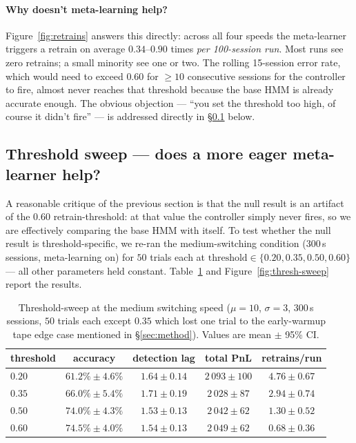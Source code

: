 \documentclass[11pt,a4paper]{article}
\begin{document}
\paragraph{Why doesn't meta-learning help?}
Figure~\ref{fig:retrains} answers this directly: across all four speeds the
meta-learner triggers a retrain on average $0.34$--$0.90$ times \emph{per
100-session run}. Most runs see zero retrains; a small minority see one or
two. The rolling 15-session error rate, which would need to exceed $0.60$ for
$\geq 10$ consecutive sessions for the controller to fire, almost never
reaches that threshold because the base HMM is already accurate enough. The
obvious objection --- ``you set the threshold too high, of course it didn't
fire'' --- is addressed directly in \S\ref{sec:threshold-sweep} below.

\subsection{Threshold sweep --- does a more eager meta-learner help?}
\label{sec:threshold-sweep}
A reasonable critique of the previous section is that the null result is an
artifact of the $0.60$ retrain-threshold: at that value the controller
simply never fires, so we are effectively comparing the base HMM with
itself. To test whether the null result is threshold-specific, we re-ran the
medium-switching condition (300\,s sessions, meta-learning on) for
$50$ trials each at $\text{threshold} \in \{0.20, 0.35, 0.50, 0.60\}$ ---
all other parameters held constant. Table~\ref{tab:thresh-sweep} and
Figure~\ref{fig:thresh-sweep} report the results.

\begin{table}[h]
\centering\small
\begin{tabular}{lcccc}
\toprule
threshold & accuracy & detection lag & total PnL & retrains/run \\
\midrule
$0.20$ & $61.2\% \pm 4.6\%$ & $1.64 \pm 0.14$ & $2\,093 \pm 100$ & $4.76 \pm 0.67$ \\
$0.35$ & $66.0\% \pm 5.4\%$ & $1.71 \pm 0.19$ & $2\,028 \pm 87$  & $2.94 \pm 0.74$ \\
$0.50$ & $74.0\% \pm 4.3\%$ & $1.53 \pm 0.13$ & $2\,042 \pm 62$  & $1.30 \pm 0.52$ \\
$0.60$ & $74.5\% \pm 4.0\%$ & $1.54 \pm 0.13$ & $2\,049 \pm 62$  & $0.68 \pm 0.36$ \\
\bottomrule
\end{tabular}
\caption{Threshold-sweep at the medium switching speed
($\mu=10$, $\sigma=3$, 300\,s sessions, $50$ trials each except $0.35$
which lost one trial to the early-warmup tape edge case mentioned in
\S\ref{sec:method}). Values are mean $\pm$ 95\% CI.}
\label{tab:thresh-sweep}
\end{table}
\end{document}
